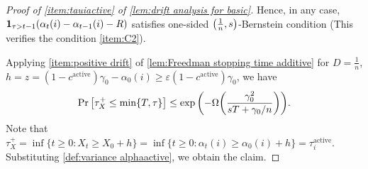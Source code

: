 \documentclass[letterpaper,11pt]{article}
\newcommand{\indicator}{\mathbf{1}}
\newcommand{\alphanorm}{\gamma}
\newcommand{\bounded}{D}
\newcommand{\variance}{s}
\newcommand{\tauincreasei}{\tau^{\mathrm{active}}_i}
\newcommand{\cactive}{c^{\mathrm{active}}}
\newcommand{\tauxplus}{\tau_X^+}
\begin{document}
\begin{proof}[Proof of \cref{item:tauiactive} of \cref{lem:drift analysis for basic}]
    Hence, in any case, $\indicator_{\tau>t-1}\qty(\alpha_t(i)-\alpha_{t-1}(i)-R)$ satisfies one-sided $\qty(\frac{1}{n}, \variance)$-Bernstein condition (This verifies the condition \ref{item:C2}). 


    Applying \cref{item:positive drift} of \cref{lem:Freedman stopping time additive} for $\bounded=\frac{1}{n}$, $h=z=(1-\cactive)\alphanorm_0-\alpha_0(i)\geq \varepsilon (1-\cactive)\alphanorm_0$, we have
    \begin{align*}
    \Pr\qty[\tauxplus\leq \min\{T,\tau\}]
    \leq \exp\qty(-\Omega\qty(\frac{\alphanorm_0^2}{\variance T+\alphanorm_0/n})).
    \end{align*}
    Note that $\tauxplus=\inf\{t\geq 0:X_t\geq X_0+h\}=\inf\{t\geq 0:\alpha_t(i)\geq \alpha_0(i)+h\}=\tauincreasei$.
    Substituting \cref{def:variance alphaactive}, we obtain the claim.
\end{proof}
\end{document}
